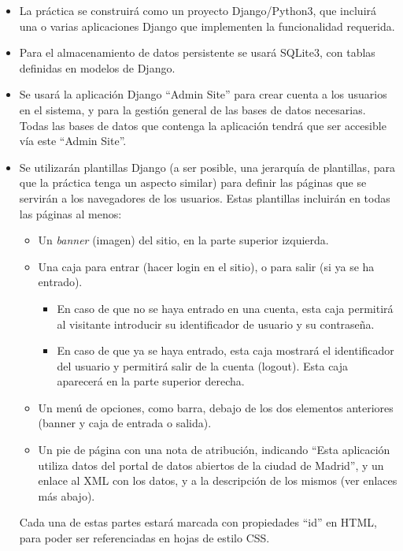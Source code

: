 \begin{itemize}

  \item La práctica se construirá como un proyecto Django/Python3, que incluirá una o varias aplicaciones Django que implementen la funcionalidad requerida.

  \item Para el almacenamiento de datos persistente se usará SQLite3, con tablas definidas en modelos de Django.

  \item Se usará la aplicación Django ``Admin Site'' para crear cuenta a los usuarios en el sistema, y para la gestión general de las bases de datos necesarias. Todas las bases de datos que contenga la aplicación tendrá que ser accesible vía este ``Admin Site''.

  \item Se utilizarán plantillas Django (a ser posible, una jerarquía de plantillas, para que la práctica tenga un aspecto similar) para definir las páginas que se servirán a los navegadores de los usuarios. Estas plantillas incluirán en todas las páginas al menos:
  \begin{itemize}
  \item Un \emph{banner} (imagen) del sitio, en la parte superior izquierda.
  \item Una caja para entrar (hacer login en el sitio), o para salir (si ya se ha entrado).
  \begin{itemize}
    \item En caso de que no se haya entrado en una cuenta, esta caja permitirá al visitante introducir su identificador de usuario y su contraseña. 
    \item En caso de que ya se haya entrado, esta caja mostrará el identificador del usuario y permitirá salir de la cuenta (logout). Esta caja aparecerá en la parte superior derecha.
  \end{itemize}
  \item Un menú de opciones, como barra, debajo de los dos elementos anteriores (banner y caja de entrada o salida).
  \item Un pie de página con una nota de atribución, indicando ``Esta aplicación utiliza datos del portal de datos abiertos de la ciudad de Madrid'', y un enlace al XML con los datos, y a la descripción de los mismos (ver enlaces más abajo).
  \end{itemize}

Cada una de estas partes estará marcada con propiedades ``id'' en HTML, para poder ser referenciadas en hojas de estilo CSS.


\end{itemize}
